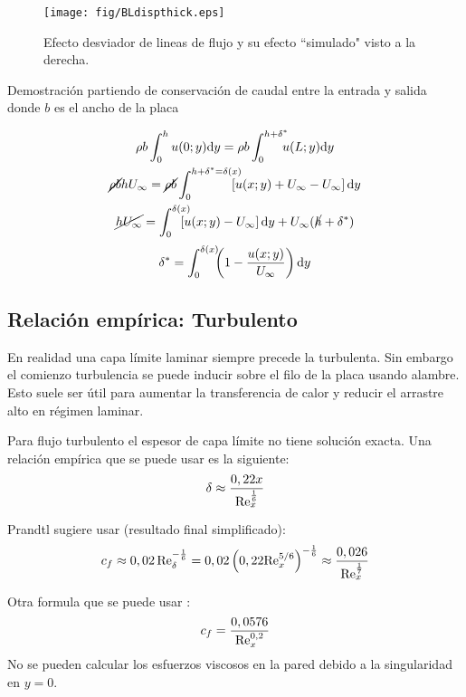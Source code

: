 \begin{figure}[htb!]
    \centering
    \texttt{[image: fig/BLdispthick.eps]}
    \caption{Efecto desviador de lineas de flujo y su efecto ``simulado"{} visto a la derecha.}
    \label{fig:displthickness}
\end{figure}

Demostración partiendo de conservación de caudal entre la entrada y salida donde $b$ es el ancho de la placa

\begin{gather*}
	\rho b \int^h_0 u(0;y)\di y = \rho b \int^{h+\dstar}_0 \!\!\!\!u(L;y)\di y \\
	\cancel{\rho b} h U_\infty =\cancel{\rho b}\int^{h+\dstar=\delta(x)}_0 \!\!\!\!\!\!\left[u(x;y)+U_\infty-U_\infty \right]\di y\\	
	\cancel{hU_\infty} = \int^{\delta(x)}_0 \!\!\!\!\!\!\left[u(x;y)-U_\infty \right]\di y+U_\infty (\cancel{h}+\dstar)
\end{gather*}
\begin{equation}
	\delta^{*} = \int_0^{\delta(x)} \!\!\!\left(1-\frac{u(x;y)}{U_\infty} \right) \textrm{d} y
\end{equation}



\subsection{Relación empírica: Turbulento}
En realidad una capa límite laminar siempre precede la turbulenta. Sin embargo el comienzo turbulencia se puede inducir sobre el filo de la placa usando alambre. Esto suele ser útil para aumentar la transferencia de calor y reducir el arrastre alto en régimen laminar.

Para flujo turbulento el espesor de capa límite no tiene solución exacta. Una relación empírica que se puede usar es la siguiente:
\begin{equation}
    \delta \approx \frac{0,22x}{\textrm{Re}_x^{\frac{1}{6}}}
\end{equation}

Prandtl sugiere usar (resultado final simplificado):
\[
c_f \approx 0,02\, \textrm{Re}_\delta^{-\frac{1}{6}} = 0,02\left(0,22 \textrm{Re}_x^{5/6}\right)^{-\frac{1}{6}}\approx \frac{0,026}{\textrm{Re}_x^{\frac{1}{7}}} 
\]

Otra formula que se puede usar \citep{kreith2011principles}:
\begin{equation}
    c_f=\frac{0,0576}{\textrm{Re}_x^{0,2}}
\end{equation}
No se pueden calcular los esfuerzos viscosos en la pared debido a la singularidad en $y=0$.

